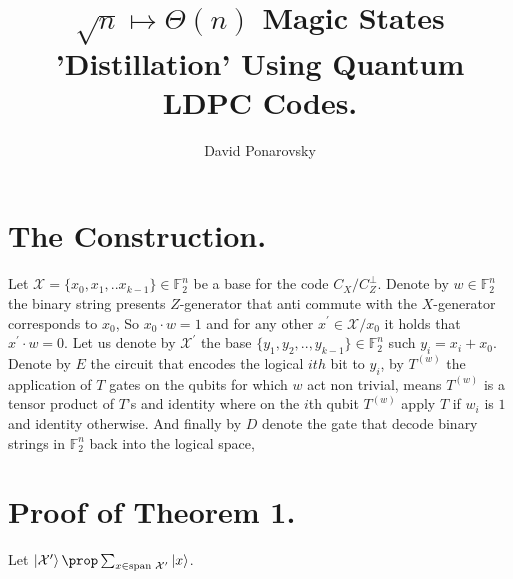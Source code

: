 \documentclass[manuscript,screen,review]{acmart}
\begin{document}

\title{ $\sqrt{n} \mapsto \Theta(n)$  Magic States 'Distillation' Using
Quantum LDPC Codes. }
\author{David Ponarovsky}
\maketitle

\newcommand*{\Mbas}{\mathcal{X}^\prime}

\section{The Construction.}

Let $\mathcal{X} = \{x_{0}, x_{1}, .. x_{k-1}\} \in \mathbb{F}_{2}^{n}$ be a
base for the code $C_{X}/C_{Z}^\perp$.  Denote by $w \in \mathbb{F}_{2}^{n}$
the binary string presents $Z$-generator that anti commute with the
$X$-generator corresponds to $x_{0}$, So $x_{0}\cdot w = 1$ and for any other
$x^\prime \in \mathcal{X}/x_{0}$ it holds that $x^{\prime}\cdot w = 0 $. Let
us denote by $\Mbas$ the base $\{ y_{1}, y_{2}, .., y_{k-1} \} \in
\mathbb{F}_{2}^{n}$ such $y_{i}= x_{i} + x_{0}$. Denote by $E$ the circuit
that encodes the logical $ith$ bit to $y_{i}$, by $T^{(w)}$ the application of
$T$ gates on the qubits for which $w$ act non trivial, means $T^{(w)}$ is a
tensor product of $T$'s and identity where on the $i$th qubit $T^{(w)}$ apply
$T$ if $w_{i}$ is $1$ and identity otherwise. And finally by $D$ denote the gate that decode binary strings in $\mathbb{F}_{2}^{n}$ back into the logical space, 


\section{Proof of Theorem 1.}

\begin{claim}
  Let $\ket{\Mbas} \prop \sum_{x \in \text{span } \Mbas }{\ket{x}}$.
\end{claim}





%

\printbibliography
\end{document}
